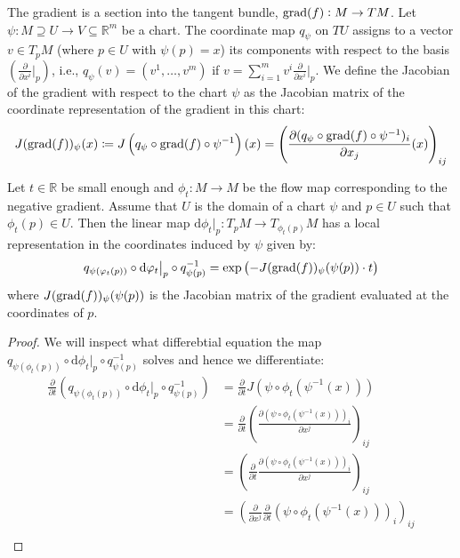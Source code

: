 \begin{definition}
	The gradient is a section into the tangent bundle, $\mathrm{grad}(f):M\to TM$.
	Let $\psi: M\supseteq U\to V \subseteq \mathbb{R}^m$ be a chart. The coordinate map $q_{\psi}$ on $TU$ assigns to a vector $v \in T_pM$ (where $p \in U$ with $\psi(p) = x$) its components with respect to the basis $\left(\frac{\partial}{\partial x^i}\big|_p\right)$, i.e., $q_{\psi}(v) = (v^1, \ldots, v^m)$ if $v = \sum_{i=1}^m v^i \frac{\partial}{\partial x^i}\big|_p$.
	We define the Jacobian of the gradient with respect to the chart $\psi$ as the Jacobian matrix of the coordinate representation of the gradient in this chart:
	\[
	J(\mathrm{grad}(f))_\psi(x) \coloneq J\left(q_{\psi}\circ \mathrm{grad}(f)\circ \psi^{-1}\right)(x) = \left(\frac{\partial (q_{\psi}\circ \mathrm{grad}(f)\circ \psi^{-1})_i}{\partial x_j}(x)\right)_{ij}
	\]
\end{definition}


\begin{lemma}
	Let $t\in \mathbb{R}$ be small enough and $\phi_t: M\to M$ be the flow map corresponding to the negative gradient. Assume that $U$ is the domain of a chart $\psi$ and $p\in U$ such that $\phi_t(p)\in U$. Then the linear map $\mathrm{d} \phi_t \big|_p: T_pM\to T_{\phi_t(p)}M$ has a local representation in the coordinates induced by $\psi$ given by:
	\[
	q_{\psi(\varphi_t(p))} \circ \mathrm{d} \varphi_t \big|_p \circ q_{\psi(p)}^{-1} = \exp\left(-J(\mathrm{grad}(f))_\psi(\psi(p)) \cdot t\right)
	\]
	where $J(\mathrm{grad}(f))_\psi(\psi(p))$ is the Jacobian matrix of the gradient evaluated at the coordinates of $p$.
\end{lemma}
\begin{proof}
We will inspect what differebtial equation the map $	q_{\psi(\phi_t(p))} \circ \mathrm{d} \phi_t \big|_p \circ q_{\psi(p)}^{-1}$ solves and hence we differentiate:
\begin{align*}
	\frac{\partial}{\partial t}	\left( q_{\psi(\phi_t(p))} \circ \mathrm{d} \phi_t \big|_p \circ q_{\psi(p)}^{-1} \right) 
	&= 	\frac{\partial}{\partial t} J(\psi \circ \phi_t (\psi^{-1}(x)))\\
	&= 	\frac{\partial}{\partial t} \left(\frac{\partial \left(\psi \circ \phi_t (\psi^{-1}(x))\right)_i}{\partial x^j}\right)_{ij}\\
    &=	 \left(\frac{\partial}{\partial t} \frac{\partial \left(\psi \circ \phi_t (\psi^{-1}(x))\right)_i}{\partial x^j}\right)_{ij}\\
    &=	 \left(\frac{\partial}{\partial x^j}\frac{\partial}{\partial t}  \left(\psi \circ \phi_t (\psi^{-1}(x))\right)_i\right)_{ij}\\
    
\end{align*}
\end{proof}













